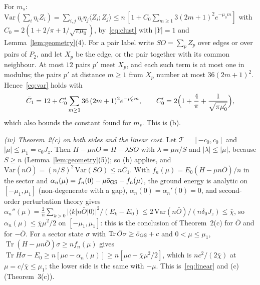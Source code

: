 \documentclass[aps,prx,onecolumn,10pt,nofootinbib,longbibliography,floatfix]{revtex4-2}
\theoremstyle{remark}
\newcommand{\Jz}{J_z}
\newcommand{\ms}{m_s}
\newcommand{\Tr}{\operatorname{Tr}}
\begin{document}
For $\ms$: $\mathrm{Var}(\sum_i\eta_iZ_i)=\sum_{i,j}\eta_i\eta_j\langle Z_i;Z_j\rangle\le n\,[1+C_0\sum_{m\ge1}3(2m+1)^2e^{-\mu_0m}]$ with
$C_0=2(1+2/\pi+1/\sqrt{\pi\mu_0})$, by~\eqref{eq:clust} with $|Y|=1$ and Lemma~\ref{lem:geometry}(4). For a pair %
label write $SO=\sum_pZ_p$ over edges or over pairs of $P_2$, and let $X_p$ be the edge, or the pair together with
its common neighbour. At most $12$ pairs $p'$ meet $X_p$, and each such term is at most one in modulus; the pairs %
$p'$ at distance $m\ge1$ from $X_p$ number at most $36(2m+1)^2$. Hence~\eqref{eq:var} holds with %
\begin{equation}
\bar C_1=12+C_0'\sum_{m\ge1}36\,(2m+1)^2e^{-\mu_0'm},\qquad C_0'=2\Bigl(1+\frac4\pi+\frac1{\sqrt{\pi\mu_0'}}\Bigr), %
\label{eq:C1bar}
\end{equation}
which also bounds the constant found for $\ms$. This is (b).

\emph{(iv) Theorem~2(c) on both sides and the linear cost.} Let $\mathcal T=[-c_0,c_0]$ and $|\mu|\le\mu_1=c_0\Jz$. Then %
$H-\mu n\bar O=H-\lambda SO$ with $\lambda=\mu n/S$ and $|\lambda|\le|\mu|$, because $S\ge n$
(Lemma~\ref{lem:geometry}(5)); so (b) applies, and %
$\mathrm{Var}(n\bar O)=(n/S)^2\,\mathrm{Var}(SO)\le n\bar C_1$. With $f_n(\mu)=E_0(H-\mu n\bar O)/n$ in the sector and
$\alpha_n(\mu)=f_n(0)-\mu\bar o_{\rm GS}-f_n(\mu)$, the ground energy is analytic on $[-\mu_1,\mu_1]$ (non-degenerate
with a gap), $\alpha_n(0)=\alpha_n'(0)=0$, and second-order perturbation theory gives
$\alpha_n''(\mu)=\frac2n\sum_{k>0}|\langle k|n\bar O|0\rangle|^2/(E_k-E_0)\le2\,\mathrm{Var}(n\bar O)/(n\delta_0\Jz)\le\bar\chi$,
so $\alpha_n(\mu)\le\bar\chi\mu^2/2$ on $[-\mu_1,\mu_1]$: this is the conclusion of Theorem~2(c) for $\bar O$ and for %
$-\bar O$. For a sector state $\sigma$ with $\Tr\bar O\sigma\ge\bar o_{\rm GS}+c$ and $0<\mu\le\mu_1$,
$\Tr(H-\mu n\bar O)\sigma\ge nf_n(\mu)$ gives
$\Tr H\sigma-E_0\ge n[\mu c-\alpha_n(\mu)]\ge n[\mu c-\bar\chi\mu^2/2]$, which is $nc^2/(2\bar\chi)$ at $\mu=c/\bar\chi\le\mu_1$;
the lower side is the same with $-\mu$. This is~\eqref{eq:linear} and (c) (Theorem~3(c)). %
\end{document}
